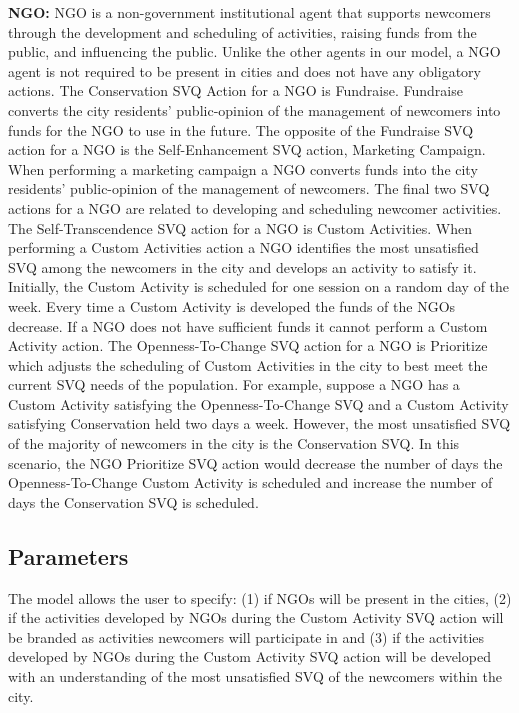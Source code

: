 \documentclass{scspaperproc}
\theoremstyle{scsthe}
\begin{document}
{\bf NGO:} NGO is a non-government institutional agent that supports newcomers through the development and scheduling of activities, raising funds from the public, and influencing the public. Unlike the other agents in our model, a NGO agent is not required to be present in cities and does not have any obligatory actions. The Conservation SVQ Action for a NGO is Fundraise. Fundraise converts the city residents' public-opinion of the management of newcomers into funds for the NGO to use in the future. The opposite of the Fundraise SVQ action for a NGO is the Self-Enhancement SVQ action, Marketing Campaign. When performing a marketing campaign a NGO converts funds into the city residents' public-opinion of the management of newcomers. The final two SVQ actions for a NGO are related to developing and scheduling newcomer activities. The Self-Transcendence SVQ action for a NGO is Custom Activities. When performing a Custom Activities action a NGO identifies the most unsatisfied SVQ among the newcomers in the city and develops an activity to satisfy it. Initially, the Custom Activity is scheduled for one session on a random day of the week. Every time a Custom Activity is developed the funds of the NGOs decrease. If a NGO does not have sufficient funds it cannot perform a Custom Activity action. The Openness-To-Change SVQ action for a NGO is Prioritize which adjusts the scheduling of Custom Activities in the city to best meet the current SVQ needs of the population. For example, suppose a NGO has a Custom Activity satisfying the Openness-To-Change SVQ and a Custom Activity satisfying Conservation held two days a week. However, the most unsatisfied SVQ of the majority of newcomers in the city is the Conservation SVQ. In this scenario, the NGO Prioritize SVQ action would decrease the number of days the Openness-To-Change Custom Activity is scheduled and increase the number of days the Conservation SVQ is scheduled.

\subsection{Parameters}
The model allows the user to specify: (1) if NGOs will be present in the cities, (2) if the activities developed by NGOs during the Custom Activity SVQ action will be branded as activities newcomers will participate in and (3) if the activities developed by NGOs during the Custom Activity SVQ action will be developed with an understanding of the most unsatisfied SVQ of the newcomers within the city. 
\end{document}
